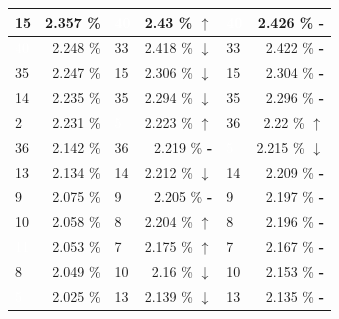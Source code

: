 \documentclass[letterpaper]{article}
\newcommand{\caseUp}[1][]{#1\textcolor[HTML]{008000}{$\mathbf{\uparrow}$}}
\newcommand{\caseStable}[1][]{#1\textcolor[HTML]{3779dd}{\textbf{-}}}
\newcommand{\caseDown}[1][]{#1\textcolor[HTML]{dd3737}{$\mathbf{\downarrow}$}}
\begin{document}
\begin{table}
\begin{tabular}{|l|r||l|r||l|r|}
	    \cellcolor[HTML]{FF69B4} 15 & 2.357 \% & \cellcolor[HTML]{483D8B} \textcolor{white}{40} & 2.43 \% \caseUp[\hfill] & \cellcolor[HTML]{483D8B} \textcolor{white}{40} & 2.426 \% \caseStable[\hfill] \\ \hline
	    \cellcolor[HTML]{483D8B} \textcolor{white}{40} & 2.248 \% & \cellcolor[HTML]{2E8B57} 33 & 2.418 \% \caseDown[\hfill] & \cellcolor[HTML]{2E8B57} 33 & 2.422 \% \caseStable[\hfill] \\ \hline
	    \cellcolor[HTML]{2E8B57} 35 & 2.247 \% & \cellcolor[HTML]{FF69B4} 15 & 2.306 \% \caseDown[\hfill] & \cellcolor[HTML]{FF69B4} 15 & 2.304 \% \caseStable[\hfill] \\ \hline
	    \cellcolor[HTML]{FF69B4} 14 & 2.235 \% & \cellcolor[HTML]{2E8B57} 35 & 2.294 \% \caseDown[\hfill] & \cellcolor[HTML]{2E8B57} 35 & 2.296 \% \caseStable[\hfill] \\ \hline
	    \cellcolor[HTML]{A0522D}  2 & 2.231 \% & \cellcolor[HTML]{8B1A1A} \textcolor{white}{5} & 2.223 \% \caseUp[\hfill] & \cellcolor[HTML]{E6E6FA} 36 & 2.22 \% \caseUp[\hfill] \\ \hline
	    \cellcolor[HTML]{E6E6FA} 36 & 2.142 \% & \cellcolor[HTML]{E6E6FA} 36 & 2.219 \% \caseStable[\hfill] & \cellcolor[HTML]{8B1A1A} \textcolor{white}{5} & 2.215 \% \caseDown[\hfill] \\ \hline
	    \cellcolor[HTML]{FFFFF0} 13 & 2.134 \% & \cellcolor[HTML]{FF69B4} 14 & 2.212 \% \caseDown[\hfill] & \cellcolor[HTML]{FF69B4} 14 & 2.209 \% \caseStable[\hfill] \\ \hline
	    \cellcolor[HTML]{1E90FF}  9 & 2.075 \% & \cellcolor[HTML]{1E90FF}  9 & 2.205 \% \caseStable[\hfill] & \cellcolor[HTML]{1E90FF} 9 & 2.197 \% \caseStable[\hfill] \\ \hline
	    \cellcolor[HTML]{1E90FF} 10 & 2.058 \% & \cellcolor[HTML]{FFC1C1}  8 & 2.204 \% \caseUp[\hfill] & \cellcolor[HTML]{FFC1C1} 8 & 2.196 \% \caseStable[\hfill] \\ \hline
	    \cellcolor[HTML]{000000} \textcolor{white}{11} & 2.053 \% & \cellcolor[HTML]{1E90FF}  7 & 2.175 \% \caseUp[\hfill] & \cellcolor[HTML]{1E90FF} 7 & 2.167 \% \caseStable[\hfill] \\ \hline
	    \cellcolor[HTML]{FFC1C1}  8 & 2.049 \% & \cellcolor[HTML]{1E90FF} 10 & 2.16 \% \caseDown[\hfill] & \cellcolor[HTML]{1E90FF} 10 & 2.153 \% \caseStable[\hfill] \\ \hline
	    \cellcolor[HTML]{8B1A1A}  \textcolor{white}{5} & 2.025 \% & \cellcolor[HTML]{FFFFF0} 13 & 2.139 \% \caseDown[\hfill] & \cellcolor[HTML]{FFFFF0} 13 & 2.135 \% \caseStable[\hfill] \\ \hline

\end{tabular}
\end{table}
\end{document}
